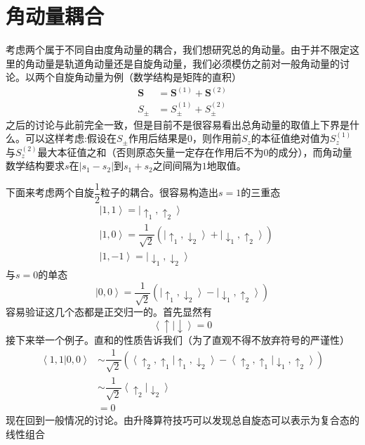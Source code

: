 \documentclass[12pt, a4paper, oneside]{ctexart}
\begin{document}
	\section{角动量耦合}
	考虑两个属于不同自由度角动量的耦合，我们想研究总的角动量。由于并不限定这里的角动量是轨道角动量还是自旋角动量，我们必须模仿之前对一般角动量的讨论。以两个自旋角动量为例（数学结构是矩阵的直积）
	\begin{align}
		\boldsymbol{S}&=\boldsymbol{S}^{(1)}+\boldsymbol{S}^{(2)}\\
		S_{\pm}&=S^{(1)}_{\pm}+S^{(2)}_{\pm}
	\end{align}
	\quad\quad 之后的讨论与此前完全一致，但是目前不是很容易看出总角动量的取值上下界是什么。可以这样考虑:假设在$S_{\pm}$作用后结果是$0$，则作用前$S_{z}$的本征值绝对值为$S_{z}^{(1)}$与$S_{z}^{(2)}$最大本征值之和（否则原态矢量一定存在作用后不为$0$的成分），而角动量数学结构要求$s$在$\left|s_{1}-s_{2}\right|$到$s_{1}+s_{2}$之间间隔为$1$地取值。\par 
	下面来考虑两个自旋$\dfrac{1}{2}$粒子的耦合。很容易构造出$s=1$的三重态
	\begin{align}
		&\left|1,1\right>=\left|\uparrow_{1},\uparrow_{2}\right>\\
		&\left|1,0\right>=\dfrac{1}{\sqrt{2}}\left(\left|\uparrow_{1},\downarrow_{2}\right>+\left|\downarrow_{1},\uparrow_{2}\right>\right)\\
		&\left|1,-1\right>=\left|\downarrow_{1},\downarrow_{2}\right>
	\end{align}
	\quad\quad 与$s=0$的单态
	\begin{equation}
		\left|0,0\right>=\dfrac{1}{\sqrt{2}}\left(\left|\uparrow_{1},\downarrow_{2}\right>-\left|\downarrow_{1},\uparrow_{2}\right>\right)
	\end{equation}
	\quad\quad 容易验证这几个态都是正交归一的。首先显然有
	\begin{equation}
		\left<\uparrow|\downarrow\right>=0
	\end{equation}
	\quad\quad 接下来举一个例子。直和的性质告诉我们（为了直观不得不放弃符号的严谨性）
	\begin{align}
		\left<1,1|0,0\right>&\sim\dfrac{1}{\sqrt{2}}\left(\left<\uparrow_{2},\uparrow_{1}|\uparrow_{1},\downarrow_{2}\right>-\left<\uparrow_{2},\uparrow_{1}|\downarrow_{1},\uparrow_{2}\right>\right)\\
		&\sim\dfrac{1}{\sqrt{2}}\left<\uparrow_{2}|\downarrow_{2}\right>\\
		&=0
	\end{align}
	\quad\quad 现在回到一般情况的讨论。由升降算符技巧可以发现总自旋态可以表示为复合态的线性组合
\end{document}
